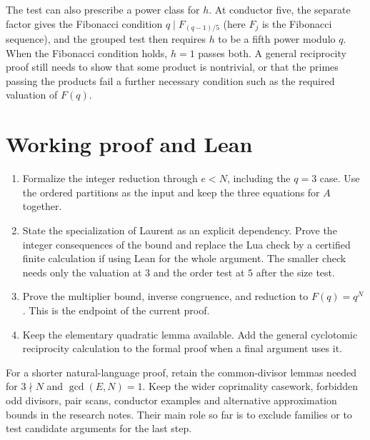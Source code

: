\documentclass[11pt]{article}
\begin{document}
The test can also prescribe a power class for $h$.
At conductor five, the separate factor gives the Fibonacci
condition $q\mid F_{(q-1)/5}$ (here $F_j$ is the Fibonacci
sequence), and the grouped test then requires $h$ to be a fifth
power modulo $q$. When the Fibonacci condition holds, $h=1$
passes both. A general reciprocity proof still needs to show
that some product is nontrivial, or that the primes passing the
products fail a further necessary condition such as the required
valuation of $F(q)$.

\section{Working proof and Lean}

\begin{enumerate}
\item Formalize the integer reduction through $e<N$, including the
$q=3$ case. Use the ordered partitions as the input and keep the
three equations for $A$ together.
\item State the specialization of Laurent as an explicit dependency.
Prove the integer consequences of the bound and replace the Lua
check by a certified finite calculation if using Lean for the
whole argument. The smaller check needs only the valuation at $3$
and the order test at $5$ after the size test.
\item Prove the multiplier bound, inverse congruence, and reduction
to $F(q)=q^N$. This is the endpoint of the current proof.
\item Keep the elementary quadratic lemma available. Add the
general cyclotomic reciprocity calculation to the formal proof
when a final argument uses it.
\end{enumerate}

For a shorter natural-language proof, retain the common-divisor
lemmas needed for $3\nmid N$ and $\gcd(E,N)=1$. Keep the wider
coprimality casework, forbidden odd divisors, pair scans, conductor
examples and alternative approximation bounds in the research notes.
Their main role so far is to exclude families or to test candidate
arguments for the last step.



\end{document}

